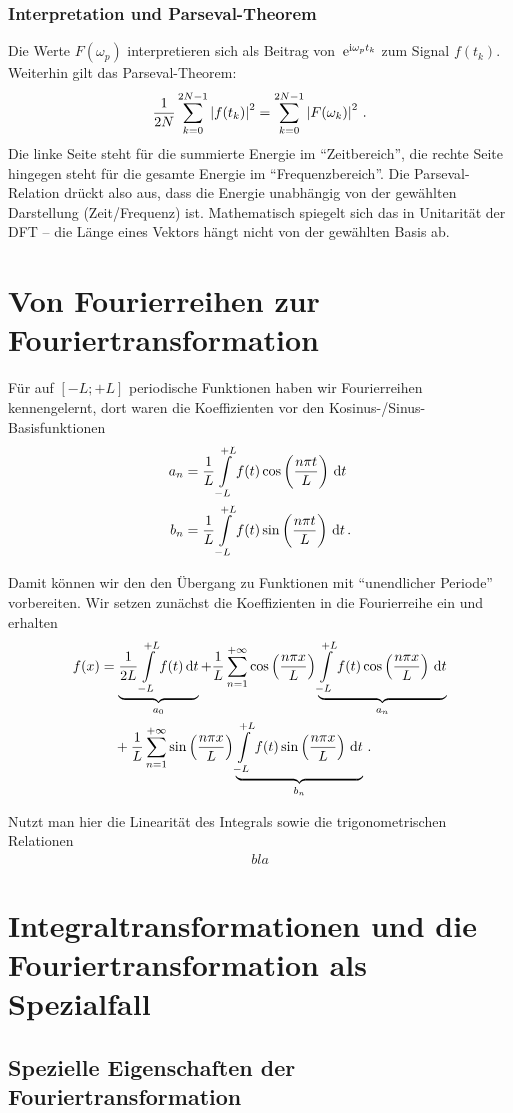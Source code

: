 \documentclass[paper=a4, fontsize=11.0pt, abstractoff, DIV12]{scrartcl}
\begin{document}
\subsubsection{Interpretation und Parseval-Theorem}

Die Werte $F(\omega_p)$ interpretieren sich als Beitrag  von
$\,{\mathrm{e}}^{\mathrm{i}\omega_p t_k}$ zum Signal $f(t_k)$. Weiterhin gilt das
Parseval-Theorem:
\begin{align}
\frac{1}{2N}\sum\limits_{k=0}^{2N-1}\left\vert f(t_k) \right\vert^2 = \sum\limits_{k=0}^{2N-1}\left\vert F(\omega_k) \right\vert^2\,.
\end{align}
Die linke Seite steht für die summierte Energie im ``Zeitbereich'', die
rechte Seite hingegen steht für die gesamte Energie im ``Frequenzbereich''.
Die Parseval-Relation drückt also aus, dass die Energie unabhängig von der
gewählten Darstellung (Zeit/Frequenz) ist. Mathematisch spiegelt sich das in
Unitarität der DFT -- die Länge eines Vektors hängt nicht von der gewählten
Basis ab.

\section{Von Fourierreihen zur Fouriertransformation}

Für auf $[-L;+L]$ periodische Funktionen haben wir Fourierreihen
kennengelernt, dort waren die Koeffizienten vor den Kosinus-/Sinus-Basisfunktionen
\begin{align*}
a_n &= \frac{1}{L}\int\limits_{-L}^{+L} f(t) \cos\left(\frac{n\pi t}{L}\right)\,\mathrm{d} t\\
b_n &= \frac{1}{L}\int\limits_{-L}^{+L} f(t) \sin\left(\frac{n\pi t}{L}\right)\,\mathrm{d} t\,.
\end{align*}

Damit können wir den den Übergang zu Funktionen mit ``unendlicher Periode''
vorbereiten. Wir setzen zunächst die Koeffizienten in die Fourierreihe ein
und erhalten
\begin{align}
f(x) &= \underbrace{\frac{1}{2L} \int\limits_{-L}^{+L}f(t)\,\mathrm{d} t}_{a_0} + \frac{1}{L}\sum\limits_{n=1}^{+\infty}\cos\left(\frac{n\pi x}{L}\right)\underbrace{\int\limits_{-L}^{+L}f(t)\cos\left(\frac{n \pi x}{L}\right)\,\mathrm{d} t}_{a_n} \nonumber\\ &\quad + \frac{1}{L}\sum\limits_{n=1}^{+\infty}\sin\left(\frac{n\pi x}{L}\right)\underbrace{\int\limits_{-L}^{+L}f(t)\sin\left(\frac{n \pi x}{L}\right)\,\mathrm{d} t}_{b_n}\,.
\end{align}

Nutzt man hier die Linearität des Integrals sowie die trigonometrischen
Relationen
\begin{align*}
bla
\end{align*}


\section{Integraltransformationen und die Fouriertransformation als Spezialfall}

\subsection{Spezielle Eigenschaften der Fouriertransformation}

\nocite{*}




\end{document}
